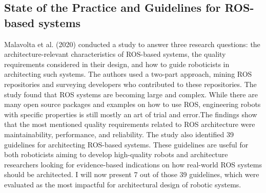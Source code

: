 \documentclass[%
paper=A4,               %
twoside=true,           %
openright,              %
11pt,                   %
bibliography=totoc,     %
titlepage=on,           %
DIV=12,                 %
BCOR=1.5cm,             %
parskip=half,            %
final
]{scrreprt}
\begin{document}
	\subsection{State of the Practice and Guidelines for ROS-based systems}
	Malavolta et al. (2020) conducted a study to answer three research questions: the architecture-relevant characteristics of ROS-based systems, the quality requirements considered in their design, and how to guide roboticists in architecting such systems. The authors used a two-part approach, mining ROS repositories and surveying developers who contributed to these repositories. The study found that ROS systems are becoming large and complex. While there are many open source packages and examples on how to use ROS, engineering robots with specific properties is still mostly an art of trial and error.The findings show that the most mentioned quality requirements related to ROS architecture were maintainability, performance, and reliability. The study also identified 39 guidelines for architecting ROS-based systems. These guidelines are useful for both roboticists aiming to develop high-quality robots and architecture researchers looking for evidence-based indications on how real-world ROS systems should be architected. I will now present 7 out of those 39 guidelines, which were evaluated as the most impactful for architectural design of robotic systems.
	\autocite{malavoltaHowYouArchitect2020}
\end{document}
